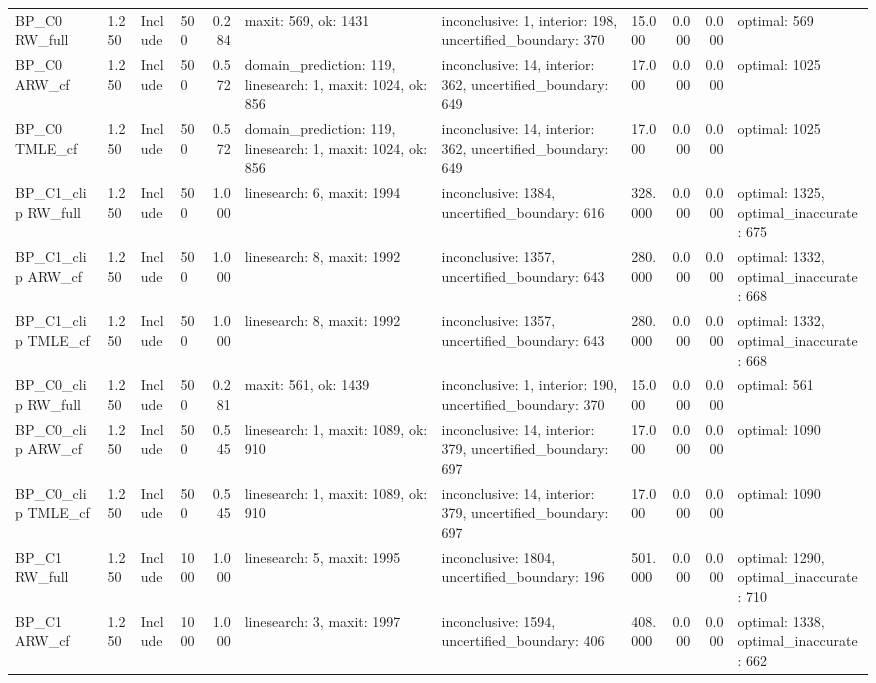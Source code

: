 \begin{tabular}{llllrlllrrl}
BP\_C0 RW\_full & 1.250 & Include & 500 & 0.284 & maxit: 569, ok: 1431 & inconclusive: 1, interior: 198, uncertified\_boundary: 370 & 15.000 & 0.000 & 0.000 & optimal: 569 \\
BP\_C0 ARW\_cf & 1.250 & Include & 500 & 0.572 & domain\_prediction: 119, linesearch: 1, maxit: 1024, ok: 856 & inconclusive: 14, interior: 362, uncertified\_boundary: 649 & 17.000 & 0.000 & 0.000 & optimal: 1025 \\
BP\_C0 TMLE\_cf & 1.250 & Include & 500 & 0.572 & domain\_prediction: 119, linesearch: 1, maxit: 1024, ok: 856 & inconclusive: 14, interior: 362, uncertified\_boundary: 649 & 17.000 & 0.000 & 0.000 & optimal: 1025 \\
BP\_C1\_clip RW\_full & 1.250 & Include & 500 & 1.000 & linesearch: 6, maxit: 1994 & inconclusive: 1384, uncertified\_boundary: 616 & 328.000 & 0.000 & 0.000 & optimal: 1325, optimal\_inaccurate: 675 \\
BP\_C1\_clip ARW\_cf & 1.250 & Include & 500 & 1.000 & linesearch: 8, maxit: 1992 & inconclusive: 1357, uncertified\_boundary: 643 & 280.000 & 0.000 & 0.000 & optimal: 1332, optimal\_inaccurate: 668 \\
BP\_C1\_clip TMLE\_cf & 1.250 & Include & 500 & 1.000 & linesearch: 8, maxit: 1992 & inconclusive: 1357, uncertified\_boundary: 643 & 280.000 & 0.000 & 0.000 & optimal: 1332, optimal\_inaccurate: 668 \\
BP\_C0\_clip RW\_full & 1.250 & Include & 500 & 0.281 & maxit: 561, ok: 1439 & inconclusive: 1, interior: 190, uncertified\_boundary: 370 & 15.000 & 0.000 & 0.000 & optimal: 561 \\
BP\_C0\_clip ARW\_cf & 1.250 & Include & 500 & 0.545 & linesearch: 1, maxit: 1089, ok: 910 & inconclusive: 14, interior: 379, uncertified\_boundary: 697 & 17.000 & 0.000 & 0.000 & optimal: 1090 \\
BP\_C0\_clip TMLE\_cf & 1.250 & Include & 500 & 0.545 & linesearch: 1, maxit: 1089, ok: 910 & inconclusive: 14, interior: 379, uncertified\_boundary: 697 & 17.000 & 0.000 & 0.000 & optimal: 1090 \\
BP\_C1 RW\_full & 1.250 & Include & 1000 & 1.000 & linesearch: 5, maxit: 1995 & inconclusive: 1804, uncertified\_boundary: 196 & 501.000 & 0.000 & 0.000 & optimal: 1290, optimal\_inaccurate: 710 \\
BP\_C1 ARW\_cf & 1.250 & Include & 1000 & 1.000 & linesearch: 3, maxit: 1997 & inconclusive: 1594, uncertified\_boundary: 406 & 408.000 & 0.000 & 0.000 & optimal: 1338, optimal\_inaccurate: 662 \\

\end{tabular}
